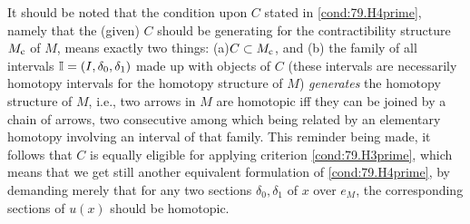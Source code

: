 \begin{remarknum}\label{rem:79.2}
  It should be noted that the condition upon $C$ stated in
  \ref{cond:79.H4prime}, namely that the (given) $C$ should be
  generating for the contractibility structure $M_{\mathrm{c}}$ of $M$, means
  exactly two things: (a)\enspace $C\subset M_{\mathrm{c}}$, and (b)\enspace
  the family of all intervals ${\mathbb{I}}=(I,\delta_0,\delta_1)$ made up with
  objects of $C$ (these intervals are necessarily homotopy intervals
  for the homotopy structure of $M$) \emph{generates} the homotopy
  structure of $M$, i.e., two arrows in $M$ are homotopic if{f} they
  can be joined by a chain of arrows, two consecutive among which
  being related by an elementary homotopy involving an interval of
  that family. This reminder being made, it follows that $C$ is
  equally eligible for applying criterion \ref{cond:79.H3prime}, which
  means that we get still another equivalent formulation of
  \ref{cond:79.H4prime}, by demanding merely that for any two sections
  $\delta_0,\delta_1$ of $x$ over $e_M$, the corresponding sections of
  $u(x)$ should be homotopic.
\end{remarknum}

